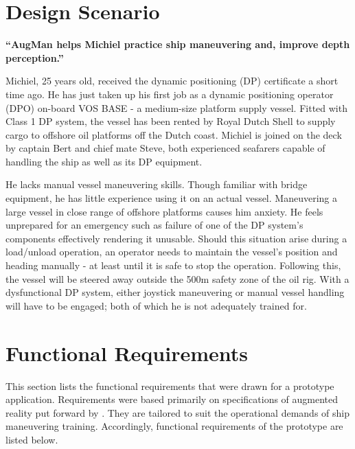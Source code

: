 \section{Design Scenario}

\textbf{“AugMan helps Michiel practice ship maneuvering and, improve depth perception.”}

Michiel, 25 years old, received the dynamic positioning (DP) certificate a short time ago. He has just taken up his first job as a dynamic positioning operator (DPO) on-board VOS BASE - a medium-size platform supply vessel. Fitted with Class 1 DP system, the vessel has been rented by Royal Dutch Shell to supply cargo to offshore oil platforms off the Dutch coast. Michiel is joined on the deck by captain Bert and chief mate Steve, both experienced seafarers capable of handling the ship as well as its DP equipment.

He lacks manual vessel maneuvering skills. Though familiar with bridge equipment, he has little experience using it on an actual vessel. Maneuvering a large vessel in close range of offshore platforms causes him anxiety. He feels unprepared for an emergency such as failure of one of the DP system's components effectively rendering it unusable. Should this situation arise during a load/unload operation, an operator needs to maintain the vessel's position and heading manually - at least until it is safe to stop the operation. Following this, the vessel will be steered away outside the 500m safety zone of the oil rig. With a dysfunctional DP system, either joystick maneuvering or manual vessel handling will have to be engaged; both of which he is not adequately trained for. 

\section{Functional Requirements}
\label{sec:functionalreqs}
This section lists the functional requirements that were drawn for a prototype application. Requirements were based primarily on specifications of augmented reality put forward by \cite{azuma1997survey}. They are tailored to suit the operational demands of ship maneuvering training. Accordingly, functional requirements of the prototype are listed below.\\

